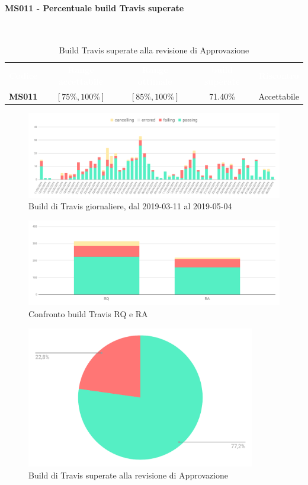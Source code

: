     \paragraph{MS011 - Percentuale build Travis superate }\mbox{}\\[0,3cm]
    \begin{table}[H]
        \centering
        \begin{tabular}{c c c c c}
        \rowcolor{greySWEight}
        \textcolor{white}{\textbf{Codice}} &
        \textcolor{white}{\textbf{Range accettabile}} &
        \textcolor{white}{\textbf{Range ottimale}} &
        \textcolor{white}{\textbf{build superate}} &
        \textcolor{white}{\textbf{Riscontro}}\\
        \textbf{MS011} & $[75\%,100\%]$ & $[85\%,100\%]$ & 71.40\% & \textcolor{YellowOrange}{Accettabile} \\
    
        \end{tabular}
        \caption{Build Travis superate alla revisione di Approvazione}
    \end{table}
    \begin{figure}[H]
        \centering
        \includegraphics[width=165mm]{sez/App_Esito/Approvazione/graph/buildGiornaliere.pdf}
        \caption{Build di Travis giornaliere, dal 2019-03-11 al 2019-05-04}
    \end{figure}
    \begin{figure}[H]
        \centering
        \includegraphics[width=165mm]{sez/App_Esito/Approvazione/graph/buildGiornaliereConfronto.pdf}
        \caption{Confronto build Travis RQ e RA}
    \end{figure}
    \begin{figure}[H]
        \centering
        \includegraphics[width=100mm]{sez/App_Esito/Approvazione/graph/buildSuperateTorta.pdf}
        \caption{Build di Travis superate alla revisione di Approvazione}
    \end{figure}